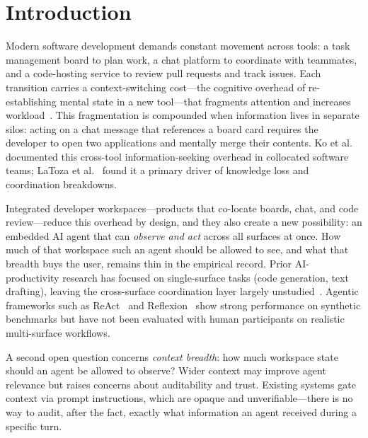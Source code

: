 \section{Introduction}
\label{sec:intro}

Modern software development demands constant movement across tools: a task
management board to plan work, a chat platform to coordinate with teammates,
and a code-hosting service to review pull requests and track issues. Each
transition carries a context-switching cost---the cognitive overhead of
re-establishing mental state in a new tool---that fragments attention and
increases workload~\cite{mark2008cost,czerwinski2004diary}. This fragmentation
is compounded when information lives in separate silos: acting on a chat
message that references a board card requires the developer to open two
applications and mentally merge their contents. Ko et
al.~\cite{ko2007information} documented this cross-tool information-seeking
overhead in collocated software teams; LaToza et al.~\cite{latoza2006maintaining}
found it a primary driver of knowledge loss and coordination breakdowns.

Integrated developer workspaces---products that co-locate boards, chat, and
code review---reduce this overhead by design, and they also create a new
possibility: an embedded AI agent that can \emph{observe and act} across all
surfaces at once. How much of that workspace such an agent should be allowed to
see, and what that breadth buys the user, remains thin in the empirical record.
Prior AI-productivity research has focused on single-surface tasks
(code generation, text drafting), leaving the cross-surface coordination layer
largely unstudied~\cite{chen2021codex,noy2023}. Agentic frameworks such as
ReAct~\cite{yao2023react} and Reflexion~\cite{shinn2023reflexion} show strong
performance on synthetic benchmarks but have not been evaluated with human
participants on realistic multi-surface workflows.

A second open question concerns \emph{context breadth}: how much workspace state
should an agent be allowed to observe? Wider context may improve agent relevance
but raises concerns about auditability and trust. Existing systems gate context
via prompt instructions, which are opaque and unverifiable---there is no way to
audit, after the fact, exactly what information an agent received during a
specific turn.

